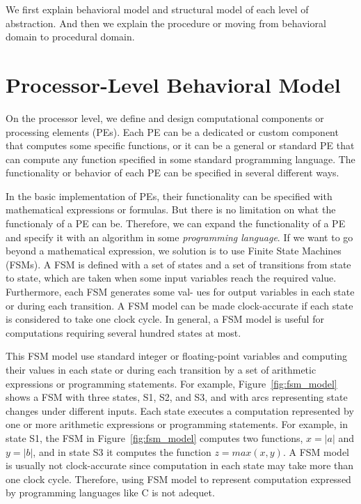 We first explain behavioral model and structural model of each level of abstraction. And then we explain the procedure or moving from behavioral domain to procedural domain.


\section{Processor-Level Behavioral Model}
\label{sec:processor_level_behavioral_model}

On the processor level, we define and design computational components or processing elements (PEs).
Each PE can be a dedicated or custom component that computes some specific functions, or it can be a general or standard PE that can compute any function specified in some standard programming language.
The functionality or behavior of each PE can be specified in several different ways.

In the basic implementation of PEs, their functionality can be specified with mathematical expressions or formulas.
But there is no limitation on what the functionaly of a PE can be.
Therefore, we can expand the functionality of a PE and specify it with an algorithm in some \textit{programming language}.
If we want to go beyond a mathematical expression, we solution is to use Finite State Machines (FSMs).
A FSM is defined with a set of states and a set of transitions from state to state, which are taken when some input variables reach the required value. Furthermore, each FSM generates some val- ues for output variables in each state or during each transition. A FSM model can be made clock-accurate if each state is considered to take one clock cycle. In general, a FSM model is useful for computations requiring several hundred states at most.

This FSM model use standard integer or floating-point variables and computing their values in each state or during each transition by a set of arithmetic expressions or programming statements.
For example, Figure~\ref{fig:fsm_model} shows a FSM with three states, S1, S2, and S3, and with arcs representing state changes under different inputs.
Each state executes a computation represented by one or more arithmetic expressions or programming statements.
For example, in state S1, the FSM in Figure~\ref{fig:fsm_model} computes two functions, $x = |a|$ and $y = |b|$, and in state S3 it computes the function $z = max (x, y)$.
A FSM model is usually not clock-accurate since computation in each state may take more than one clock cycle.
Therefore, using FSM model to represent computation expressed by programming languages like C is not adequet.

